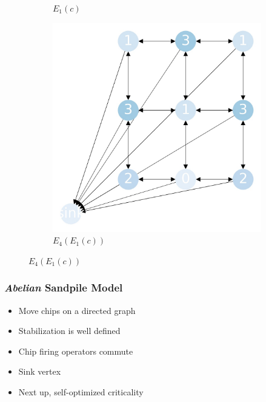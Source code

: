 \documentclass{beamer}
\begin{document}
\begin{frame}
\begin{figure}[h!]
\begin{subfigure}[b]{0.3\linewidth}
      \caption{$E_1(c)$}
    \end{subfigure}
    \begin{subfigure}[b]{0.3\linewidth}
      \includegraphics[width=\linewidth]{sandpile_chip_fire_2p}
      \caption{$E_4(E_1(c))$}
    \end{subfigure}
  \end{figure}

\end{frame}


\begin{frame}
\frametitle{\textit{Abelian} Sandpile Model}
  \begin{itemize}
    \item Move chips on a directed graph
    \item Stabilization is well defined
    \item Chip firing operators commute
    \item Sink vertex
    \item Next up, self-optimized criticality
  \end{itemize}
\end{frame}
\end{document}
